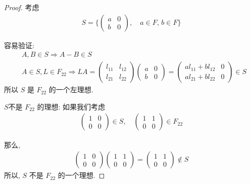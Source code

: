 \documentclass[utf8]{ctexbook}
\begin{document}
\begin{proof}
考虑 
\begin{align*}
S = \{ \left( 
\begin{array}{cc}
a & 0 \\
b & 0
\end{array}
\right), \quad a \in F, \, b \in F \}
\end{align*}

容易验证:
\begin{align*}
& A, B \in S \Longrightarrow A- B \in S \\
& A \in S, L \in F_{22} \Longrightarrow L A = \left( \begin{array}{cc}
l_{11} & l_{12} \\
l_{21} & l_{22}
\end{array} 
\right)
\left( 
\begin{array}{cc}
a & 0 \\
b & 0
\end{array}
\right)
=
\left( 
\begin{array}{cc}
a l_{11} + b l_{12} & 0 \\
a l_{21} + b l_{22} & 0
\end{array}
\right)
\in S
\end{align*}
所以 $S$ 是 $F_{22}$ 的一个左理想.

$S$不是 $F_{22}$ 的理想: 如果我们考虑
\begin{align*}
\left( 
\begin{array}{cc}
1 & 0 \\
0 & 0
\end{array}
\right) \in S, \quad 
\left( 
\begin{array}{cc}
1 & 1 \\
0 & 0
\end{array}
\right) \in F_{22}
\end{align*}

那么,
\begin{align*}
\left( 
\begin{array}{cc}
1 & 0 \\
0 & 0
\end{array}
\right) 
\left( 
\begin{array}{cc}
1 & 1 \\
0 & 0
\end{array}
\right) 
= 
\left( 
\begin{array}{cc}
1 & 1 \\
0 & 0
\end{array}
\right) 
\not \in S
\end{align*}
所以, $S$ 不是 $F_{22}$ 的一个理想.

\end{proof}
\end{document}
